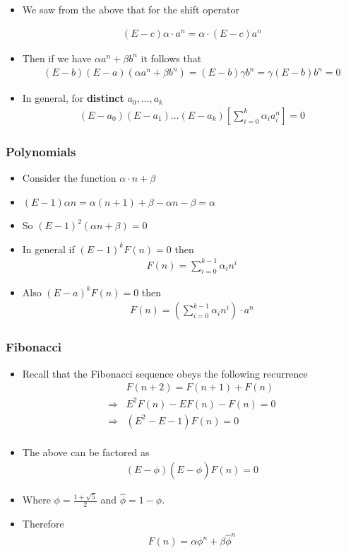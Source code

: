 \documentclass{beamer}
\begin{document}
\begin{frame}
  \begin{itemize}
  \item We saw from the above that for the shift operator

    \begin{align*}
      (E-c)\alpha\cdot a^n=\alpha\cdot (E-c)a^n
    \end{align*}
\item Then if we have $\alpha a^n+\beta b^n$ it follows that 
  \begin{align*}
    (E-b)(E-a)(\alpha a^n+\beta b^n)=(E-b)\gamma b^n=\gamma (E-b)b^n=0
  \end{align*}
\item In general, for \textbf{distinct} $a_0,\ldots, a_k$ 
  \begin{align*}
   (E-a_0)(E-a_1)\ldots (E-a_k)\left[\sum_{i=0}^k\alpha_ia_i^n \right]=0 
  \end{align*}
  \end{itemize}
\end{frame}
\begin{frame}
  \frametitle{Polynomials}
  
  \begin{itemize}
  \item Consider the function $\alpha\cdot n+\beta$
  \item $(E-1)\alpha n=\alpha(n+1)+\beta-\alpha n-\beta=\alpha$
  \item So $(E-1)^2(\alpha n+\beta)=0$
  \item In general if $(E-1)^kF(n)=0$ then
    \begin{align*}
      F(n)=\sum_{i=0}^{k-1}\alpha_in^i
    \end{align*}
\item Also $(E-a)^kF(n)=0$ then
  \begin{align*}
    F(n)=\left(\sum_{i=0}^{k-1}\alpha_in^i\right)\cdot a^n 
  \end{align*}
  \end{itemize}
\end{frame}
\begin{frame}
  \frametitle{Fibonacci}
  \begin{itemize}
  \item Recall that the Fibonacci sequence obeys the following recurrence
    \begin{align*}
      &F(n+2)=F(n+1)+F(n)\\
    \Rightarrow & E^2F(n)-EF(n)-F(n)=0\\
    \Rightarrow & (E^2-E-1)F(n)=0\\
    \end{align*}
\item The above can be factored as 
  \begin{align*}
    (E-\phi)(E-\hat{\phi})F(n)=0
  \end{align*}
\item Where $\phi=\frac{1+\sqrt{5}}{2}$ and $\hat{\phi}=1-\phi$.
\item Therefore
  \begin{align*}
    F(n)=\alpha \phi^n+\beta \hat{\phi}^n
  \end{align*}
  \end{itemize}
\end{frame}
\end{document}
